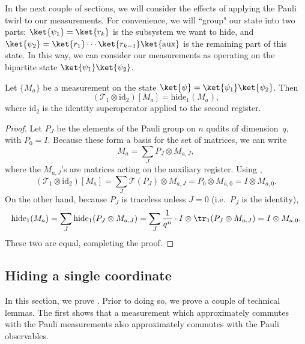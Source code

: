 \documentclass[11pt]{article}
\newcommand{\twirl}{\mathscr{T}}
\newcommand{\id}{\mathrm{id}}
\newcommand{\hide}[2]{\mathrm{hide}_{#1}(#2)}
\begin{document}
In the next couple of sections,
we will consider the effects of applying the Pauli twirl to our measurements.
For convenience, we will ``group" our state into two parts: $\ket{\psi_1} = \ket{r_k}$ 
is the subsystem we want to hide,
and $\ket{\psi_2} = \ket{r_1} \cdots \ket{r_{k-1}} \ket{\mathrm{aux}}$ is the remaining part of this state.
In this way, we can consider our measurements as operating on the bipartite state $\ket{\psi_1} \ket{\psi_2}$.

\begin{proposition}\label{prop:hidden-twirl}
Let $\{M_a\}$ be a measurement on the state $\ket{\psi} = \ket{\psi_1} \ket{\psi_2}$.
Then
\begin{equation*}
(\twirl_1\otimes \id_{2})[M_a]
=
\hide{1}{M_a},
\end{equation*}
where $\id_{2}$ is the identity superoperator applied to the second register.
\end{proposition}
\begin{proof}
Let $P_J$ be the elements of the Pauli group on $n$ qudits of dimension~$q$, with $P_0 = I$.
Because these form a basis for the set of matrices, we can write
\begin{equation*}
M_a = \sum_{J} P_J \otimes M_{a, J},
\end{equation*}
where the $M_{a, J}$'s are matrices acting on the auxiliary register. 
Using ,
\begin{equation*}
(\twirl_1\otimes \id_{2})[M_a]
= \sum_{J}  \twirl(P_J) \otimes M_{a,J}
= P_0 \otimes M_{a,0}
= I \otimes M_{a,0}.
\end{equation*}
On the other hand, because $P_J$ is traceless unless $J=0$ (i.e.\ $P_J$ is the identity),
\begin{equation*}
\hide{1}{M_a}
= \sum_{J} \hide{1}{P_J \otimes M_{a,J}} 
= \sum_{J} \frac{1}{q^n} \cdot I \otimes \tr_1(P_J \otimes M_{a,J})
= I \otimes M_{a, 0}.
\end{equation*}
These two are equal, completing the proof.
\end{proof}

\subsection{Hiding a single coordinate}\label{sec:data-hiding-game}

In this section, we prove . Prior to doing so, we prove a couple of technical lemmas.
The first shows that a measurement which approximately commutes with the Pauli measurements
also approximately commutes with the Pauli observables.
\end{document}
